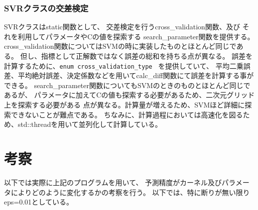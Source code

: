 \documentclass[]{jsarticle}
\begin{document}
\subsubsection{SVRクラスの交差検定}
SVRクラスはstatic関数として、
交差検定を行うcross\_validation関数、及び
それを利用してパラメータやCの値を探索する search\_parameter関数を提供する。
cross\_validation関数についてはSVMの時に実装したものとほとんど同じである。
但し、指標として正解数ではなく誤差の総和を持ちる点が異なる。
誤差を計算するために、\verb|enum cross_validation_type | を提供していて、
平均二乗誤差、平均絶対誤差、決定係数などを用いてcalc\_diff関数にて誤差を計算する事ができる。
search\_parameter関数についてもSVMのときのものとほとんど同じであるが、
パラメータに加えてCの値も探索する必要があるため、二次元グリッド上を探索する必要がある
点が異なる。計算量が増えるため、SVMほど詳細に探索できないことが難点である。
ちなみに、計算過程においては高速化を図るため、std::threadを用いて並列化して計算している。

\newpage
\section{考察}
以下では実際に上記のプログラムを用いて、
予測精度がカーネル及びパラメータによりどのように変化するかの考察を行う。
以下では、特に断りが無い限りeps=0.01としている。
\end{document}
